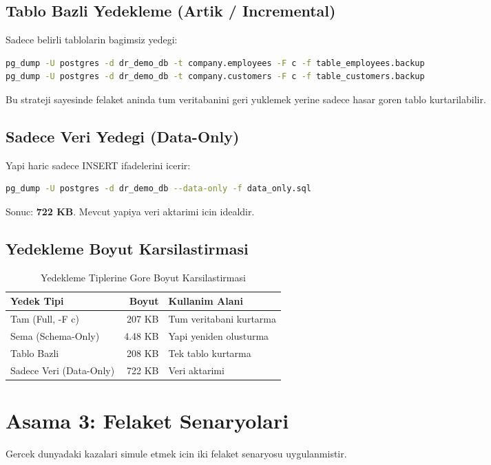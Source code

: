 \documentclass[12pt,a4paper]{article}
\begin{document}
\subsection{Tablo Bazli Yedekleme (Artik / Incremental)}
Sadece belirli tablolarin bagimsiz yedegi:
\begin{lstlisting}[language=bash, caption=Tablo Bazli Yedekleme]
pg_dump -U postgres -d dr_demo_db -t company.employees -F c -f table_employees.backup
pg_dump -U postgres -d dr_demo_db -t company.customers -F c -f table_customers.backup
\end{lstlisting}
Bu strateji sayesinde felaket aninda tum veritabanini geri yuklemek yerine sadece hasar goren tablo kurtarilabilir.

\subsection{Sadece Veri Yedegi (Data-Only)}
Yapi haric sadece INSERT ifadelerini icerir:
\begin{lstlisting}[language=bash, caption=Data-Only Yedekleme]
pg_dump -U postgres -d dr_demo_db --data-only -f data_only.sql
\end{lstlisting}
Sonuc: \textbf{722 KB}. Mevcut yapiya veri aktarimi icin idealdir.

\subsection{Yedekleme Boyut Karsilastirmasi}
\begin{table}[h]
\centering
\begin{tabular}{|l|r|l|}
\hline
\textbf{Yedek Tipi} & \textbf{Boyut} & \textbf{Kullanim Alani} \\
\hline
Tam (Full, -F c) & 207 KB & Tum veritabani kurtarma \\
Sema (Schema-Only) & 4.48 KB & Yapi yeniden olusturma \\
Tablo Bazli & 208 KB & Tek tablo kurtarma \\
Sadece Veri (Data-Only) & 722 KB & Veri aktarimi \\
\hline
\end{tabular}
\caption{Yedekleme Tiplerine Gore Boyut Karsilastirmasi}
\end{table}

\section{Asama 3: Felaket Senaryolari}
Gercek dunyadaki kazalari simule etmek icin iki felaket senaryosu uygulanmistir.
\end{document}

